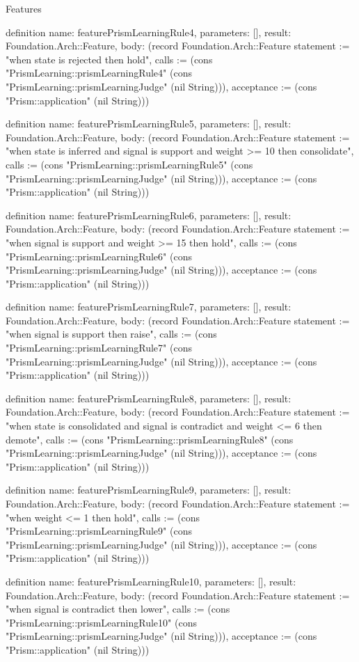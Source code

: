 \begin{lexlean}{Features}
\begin{semanticmodule}
definition{
  name: featurePrismLearningRule4,
  parameters: [],
  result: Foundation.Arch::Feature,
  body: (record Foundation.Arch::Feature {statement := "when state is rejected then hold", calls := (cons "PrismLearning::prismLearningRule4" (cons "PrismLearning::prismLearningJudge" (nil String))), acceptance := (cons "Prism::application" (nil String))})
}

definition{
  name: featurePrismLearningRule5,
  parameters: [],
  result: Foundation.Arch::Feature,
  body: (record Foundation.Arch::Feature {statement := "when state is inferred and signal is support and weight >= 10 then consolidate", calls := (cons "PrismLearning::prismLearningRule5" (cons "PrismLearning::prismLearningJudge" (nil String))), acceptance := (cons "Prism::application" (nil String))})
}

definition{
  name: featurePrismLearningRule6,
  parameters: [],
  result: Foundation.Arch::Feature,
  body: (record Foundation.Arch::Feature {statement := "when signal is support and weight >= 15 then hold", calls := (cons "PrismLearning::prismLearningRule6" (cons "PrismLearning::prismLearningJudge" (nil String))), acceptance := (cons "Prism::application" (nil String))})
}

definition{
  name: featurePrismLearningRule7,
  parameters: [],
  result: Foundation.Arch::Feature,
  body: (record Foundation.Arch::Feature {statement := "when signal is support then raise", calls := (cons "PrismLearning::prismLearningRule7" (cons "PrismLearning::prismLearningJudge" (nil String))), acceptance := (cons "Prism::application" (nil String))})
}

definition{
  name: featurePrismLearningRule8,
  parameters: [],
  result: Foundation.Arch::Feature,
  body: (record Foundation.Arch::Feature {statement := "when state is consolidated and signal is contradict and weight <= 6 then demote", calls := (cons "PrismLearning::prismLearningRule8" (cons "PrismLearning::prismLearningJudge" (nil String))), acceptance := (cons "Prism::application" (nil String))})
}

definition{
  name: featurePrismLearningRule9,
  parameters: [],
  result: Foundation.Arch::Feature,
  body: (record Foundation.Arch::Feature {statement := "when weight <= 1 then hold", calls := (cons "PrismLearning::prismLearningRule9" (cons "PrismLearning::prismLearningJudge" (nil String))), acceptance := (cons "Prism::application" (nil String))})
}

definition{
  name: featurePrismLearningRule10,
  parameters: [],
  result: Foundation.Arch::Feature,
  body: (record Foundation.Arch::Feature {statement := "when signal is contradict then lower", calls := (cons "PrismLearning::prismLearningRule10" (cons "PrismLearning::prismLearningJudge" (nil String))), acceptance := (cons "Prism::application" (nil String))})
}


\end{semanticmodule}
\end{lexlean}
